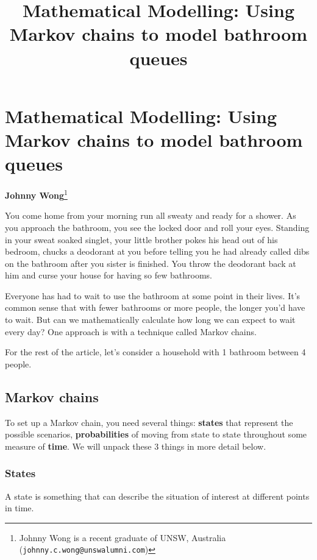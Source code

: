 \usetikzlibrary{automata, positioning}



\section*{Mathematical Modelling: Using Markov chains to model bathroom queues}
\vspace{-.30cm}

\title{Mathematical Modelling: Using Markov chains to model bathroom queues}

\begin{center}
	\textbf{Johnny Wong}\footnote{%
		Johnny Wong is a recent graduate of UNSW, Australia ({\tt johnny.c.wong@unswalumni.com})}
\end{center}

\vspace{5mm}

You come home from your morning run all sweaty and ready for a shower. As you approach the bathroom, you see the locked door and roll your eyes. Standing in your sweat soaked singlet, your little brother pokes his head out of his bedroom, chucks a deodorant at you before telling you he had already called dibs on the bathroom after you sister is finished. You throw the deodorant back at him and curse your house for having so few bathrooms.

Everyone has had to wait to use the bathroom at some point in their lives. It's common sense that with fewer bathrooms or more people, the longer you'd have to wait. But can we mathematically calculate how long we can expect to wait every day? One approach is with a technique called Markov chains.

For the rest of the article, let's consider a household with 1 bathroom between 4 people.

\subsection*{Markov chains}
To set up a Markov chain, you need several things: \textbf{states} that represent the possible scenarios, \textbf{probabilities} of moving from state to state throughout some measure of \textbf{time}. We will unpack these 3 things in more detail below.

\subsubsection*{States}
A state is something that can describe the situation of interest at different points in time.

